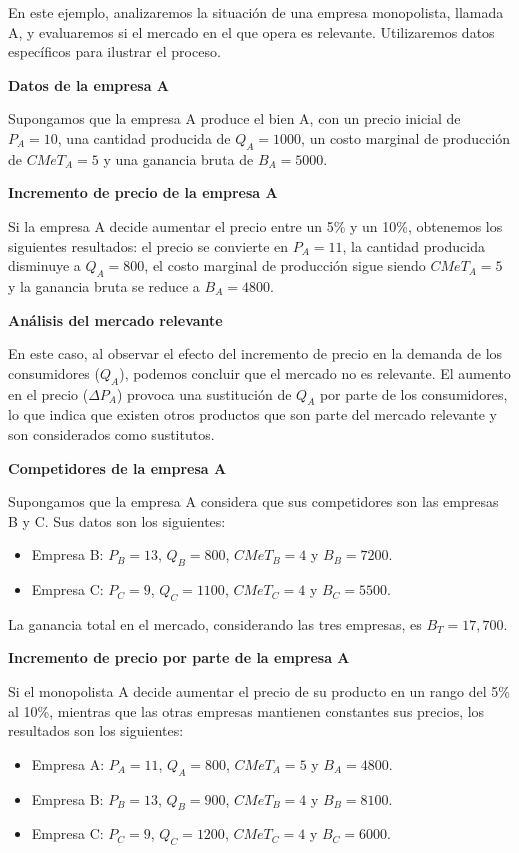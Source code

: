 \documentclass[
  doc,
  floatsintext,
  longtable,
  a4paper,
  nolmodern,
  notxfonts,
  notimes,
  12pt,
  colorlinks=true,linkcolor=blue,citecolor=blue,urlcolor=blue]{apa7}
\providecommand{\tightlist}{%
  \setlength{\itemsep}{0pt}\setlength{\parskip}{0pt}}
\begin{document}
En este ejemplo, analizaremos la situación de una empresa monopolista,
llamada A, y evaluaremos si el mercado en el que opera es relevante.
Utilizaremos datos específicos para ilustrar el proceso.

\textbf{Datos de la empresa A}

Supongamos que la empresa A produce el bien A, con un precio inicial de
\(P_A = 10\), una cantidad producida de \(Q_A = 1000\), un costo
marginal de producción de \(CMeT_A = 5\) y una ganancia bruta de
\(B_A = 5000\).

\textbf{Incremento de precio de la empresa A}

Si la empresa A decide aumentar el precio entre un 5\% y un 10\%,
obtenemos los siguientes resultados: el precio se convierte en
\(P_A = 11\), la cantidad producida disminuye a \(Q_A = 800\), el costo
marginal de producción sigue siendo \(CMeT_A = 5\) y la ganancia bruta
se reduce a \(B_A = 4800\).

\textbf{Análisis del mercado relevante}

En este caso, al observar el efecto del incremento de precio en la
demanda de los consumidores (\(Q_A\)), podemos concluir que el mercado
no es relevante. El aumento en el precio (\(\Delta P_A\)) provoca una
sustitución de \(Q_A\) por parte de los consumidores, lo que indica que
existen otros productos que son parte del mercado relevante y son
considerados como sustitutos.

\textbf{Competidores de la empresa A}

Supongamos que la empresa A considera que sus competidores son las
empresas B y C. Sus datos son los siguientes:

\begin{itemize}
\tightlist
\item
  Empresa B: \(P_B = 13\), \(Q_B = 800\), \(CMeT_B = 4\) y
  \(B_B = 7200\).
\item
  Empresa C: \(P_C = 9\), \(Q_C = 1100\), \(CMeT_C = 4\) y
  \(B_C = 5500\).
\end{itemize}

La ganancia total en el mercado, considerando las tres empresas, es
\(B_T = 17,700\).

\textbf{Incremento de precio por parte de la empresa A}

Si el monopolista A decide aumentar el precio de su producto en un rango
del 5\% al 10\%, mientras que las otras empresas mantienen constantes
sus precios, los resultados son los siguientes:

\begin{itemize}
\tightlist
\item
  Empresa A: \(P_A = 11\), \(Q_A = 800\), \(CMeT_A = 5\) y
  \(B_A = 4800\).
\item
  Empresa B: \(P_B = 13\), \(Q_B = 900\), \(CMeT_B = 4\) y
  \(B_B = 8100\).
\item
  Empresa C: \(P_C = 9\), \(Q_C = 1200\), \(CMeT_C = 4\) y
  \(B_C = 6000\).
\end{itemize}
\end{document}
